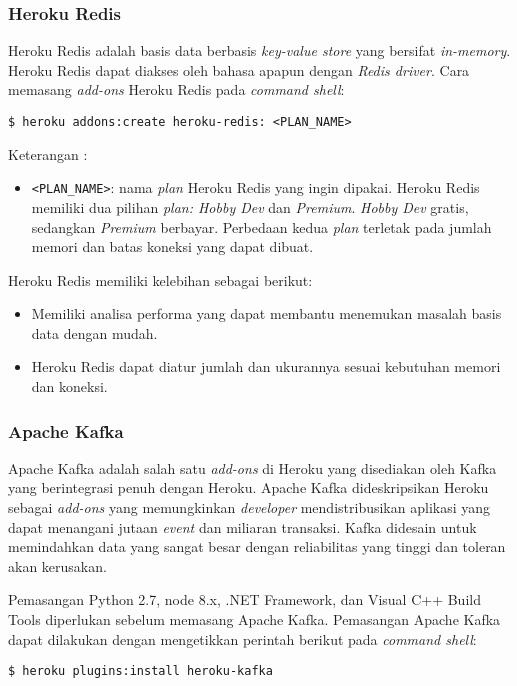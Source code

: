 \subsubsection{Heroku Redis}
Heroku Redis adalah basis data berbasis \textit{key-value store} yang bersifat \textit{in-memory}. Heroku Redis dapat diakses oleh bahasa apapun dengan \textit{Redis driver}. Cara memasang \textit{add-ons} Heroku Redis pada \textit{command shell}:
\begin{lstlisting}
$ heroku addons:create heroku-redis: <PLAN_NAME>	
\end{lstlisting}
Keterangan :
\begin{itemize}
\item \texttt{<PLAN\_NAME>}: nama \textit{plan} Heroku Redis yang ingin dipakai. Heroku Redis memiliki dua pilihan \textit{plan: Hobby Dev} dan \textit{Premium}. \textit{Hobby Dev} gratis, sedangkan \textit{Premium} berbayar. Perbedaan kedua \textit{plan} terletak pada jumlah memori dan batas koneksi yang dapat dibuat.
\end{itemize}

Heroku Redis memiliki kelebihan sebagai berikut:
\begin{itemize}
\item Memiliki analisa performa yang dapat membantu menemukan masalah basis data dengan mudah.
\item Heroku Redis dapat diatur jumlah dan ukurannya sesuai kebutuhan memori dan koneksi.
\end{itemize}

\subsubsection{Apache Kafka}
Apache Kafka adalah salah satu \textit{add-ons} di Heroku yang disediakan oleh Kafka yang berintegrasi penuh dengan Heroku. Apache Kafka dideskripsikan Heroku sebagai \textit{add-ons} yang memungkinkan \textit{developer} mendistribusikan aplikasi yang dapat menangani jutaan \textit{event} dan miliaran transaksi. Kafka didesain untuk memindahkan data yang sangat besar dengan reliabilitas yang tinggi dan toleran akan kerusakan.

Pemasangan Python 2.7, node 8.x, .NET Framework, dan Visual C++ Build Tools diperlukan sebelum memasang Apache Kafka. Pemasangan Apache Kafka dapat dilakukan dengan mengetikkan perintah berikut pada \textit{command shell}:
\begin{lstlisting}
$ heroku plugins:install heroku-kafka	
\end{lstlisting}

